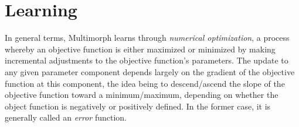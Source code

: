 \section{Learning}
\label{sec:mcmm-learning}

%

In general terms, Multimorph learns through \emph{numerical optimization}, a process whereby an objective function is either maximized or minimized by making incremental adjustments to the objective function's parameters. The update to any given parameter component depends largely on the gradient of the objective function at this component, the idea being to descend/ascend the slope of the objective function toward a minimum/maximum, depending on whether the object function is negatively or positively defined. In the former case, it is generally called an \emph{error} function. 

